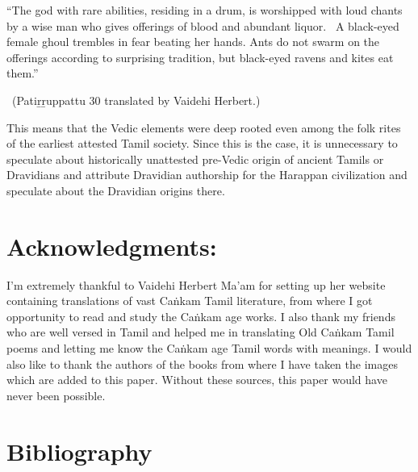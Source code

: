 \begin{myquote}
“The god with rare abilities, residing in a drum, is worshipped with loud chants by a wise man who gives offerings of blood and abundant liquor.  A black-eyed female ghoul trembles in fear beating her hands. Ants do not swarm on the offerings according to surprising tradition, but black-eyed ravens and kites eat them.”

~\hfill (Patiṟṟuppattu 30 translated by Vaidehi Herbert.)
\end{myquote}

This means that the Vedic elements were deep rooted even among the folk rites of the earliest attested Tamil society. Since this is the case, it is unnecessary to speculate about historically unattested pre-Vedic origin of ancient Tamils or Dravidians and attribute Dravidian authorship for the Harappan civilization and speculate about the Dravidian origins there.


\section*{Acknowledgments:}

I’m extremely thankful to Vaidehi Herbert Ma’am for setting up her website containing translations of vast Caṅkam Tamil literature, from where I got opportunity to read and study the Caṅkam age works. I also thank my friends who are well versed in Tamil and helped me in translating Old Caṅkam Tamil poems and letting me know the Caṅkam age Tamil words with meanings. I would also like to thank the authors of the books from where I have taken the images which are added to this paper. Without these sources, this paper would have never been possible.

\newpage


\section*{Bibliography}

